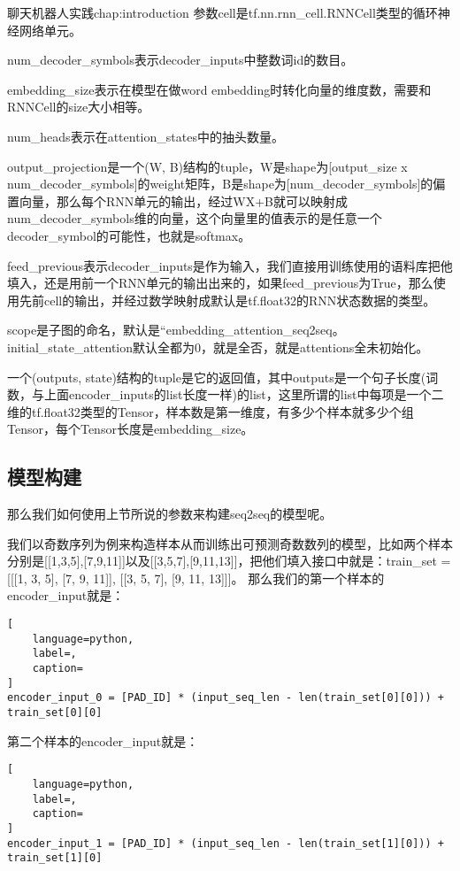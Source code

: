 \begin{cuzchapter}{聊天机器人实践}{chap:introduction}
参数cell是tf.nn.rnn\_cell.RNNCell类型的循环神经网络单元。

num\_decoder\_symbols表示decoder\_inputs中整数词id的数目。

embedding\_size表示在模型在做word embedding时转化向量的维度数，需要和RNNCell的size大小相等。

num\_heads表示在attention\_states中的抽头数量。

output\_projection是一个(W, B)结构的tuple，W是shape为[output\_size x num\_decoder\_symbols]的weight矩阵，B是shape为[num\_decoder\_symbols]的偏置向量，那么每个RNN单元的输出，经过WX+B就可以映射成num\_decoder\_symbols维的向量，这个向量里的值表示的是任意一个decoder\_symbol的可能性，也就是softmax。

feed\_previous表示decoder\_inputs是作为输入，我们直接用训练使用的语料库把他填入，还是用前一个RNN单元的输出出来的，如果feed\_previous为True，那么使用先前cell的输出，并经过数学映射成默认是tf.float32的RNN状态数据的类型。

scope是子图的命名，默认是“embedding\_attention\_seq2seq。initial\_state\_attention默认全都为0，就是全否，就是attentions全未初始化。

一个(outputs, state)结构的tuple是它的返回值，其中outputs是一个句子长度(词数，与上面encoder\_inputs的list长度一样)的list，这里所谓的list中每项是一个二维的tf.float32类型的Tensor，样本数是第一维度，有多少个样本就多少个组Tensor，每个Tensor长度是embedding\_size。
\subsection{模型构建}\label{sec:background}
那么我们如何使用上节所说的参数来构建seq2seq的模型呢。

我们以奇数序列为例来构造样本从而训练出可预测奇数数列的模型，比如两个样本分别是[[1,3,5],[7,9,11]]以及[[3,5,7],[9,11,13]]，把他们填入接口中就是：train\_set = [[[1, 3, 5], [7, 9, 11]], [[3, 5, 7], [9, 11, 13]]]。
那么我们的第一个样本的encoder\_input就是：
\begin{lstlisting}[
    language=python,
    label=,
    caption=
]
encoder_input_0 = [PAD_ID] * (input_seq_len - len(train_set[0][0])) + train_set[0][0]
\end{lstlisting}

第二个样本的encoder\_input就是：
\begin{lstlisting}[
    language=python,
    label=,
    caption=
]
encoder_input_1 = [PAD_ID] * (input_seq_len - len(train_set[1][0])) + train_set[1][0]
\end{lstlisting}


\end{cuzchapter}
